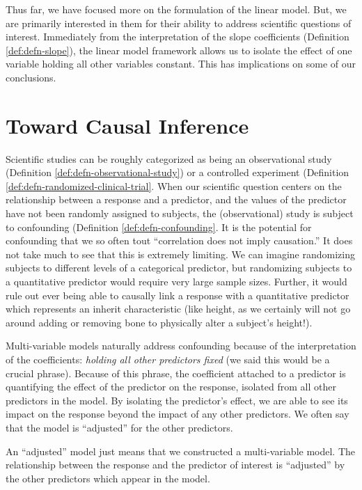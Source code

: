 \documentclass[
]{book}
\theoremstyle{plain}
\theoremstyle{mydefn}
\theoremstyle{myexmpl}
\theoremstyle{remark}
\begin{document}
Thus far, we have focused more on the formulation of the linear model. But, we are primarily interested in them for their ability to address scientific questions of interest. Immediately from the interpretation of the slope coefficients (Definition \ref{def:defn-slope}), the linear model framework allows us to isolate the effect of one variable holding all other variables constant. This has implications on some of our conclusions.

\hypertarget{toward-causal-inference}{%
\section{Toward Causal Inference}\label{toward-causal-inference}}

Scientific studies can be roughly categorized as being an observational study (Definition \ref{def:defn-observational-study}) or a controlled experiment (Definition \ref{def:defn-randomized-clinical-trial}. When our scientific question centers on the relationship between a response and a predictor, and the values of the predictor have not been randomly assigned to subjects, the (observational) study is subject to confounding (Definition \ref{def:defn-confounding}. It is the potential for confounding that we so often tout ``correlation does not imply causation.'' It does not take much to see that this is extremely limiting. We can imagine randomizing subjects to different levels of a categorical predictor, but randomizing subjects to a quantitative predictor would require very large sample sizes. Further, it would rule out ever being able to causally link a response with a quantitative predictor which represents an inherit characteristic (like height, as we certainly will not go around adding or removing bone to physically alter a subject's height!).

Multi-variable models naturally address confounding because of the interpretation of the coefficients: \emph{holding all other predictors fixed} (we said this would be a crucial phrase). Because of this phrase, the coefficient attached to a predictor is quantifying the effect of the predictor on the response, isolated from all other predictors in the model. By isolating the predictor's effect, we are able to see its impact on the response beyond the impact of any other predictors. We often say that the model is ``adjusted'' for the other predictors.

\begin{rmdtip}
An ``adjusted'' model just means that we constructed a multi-variable model. The relationship between the response and the predictor of interest is ``adjusted'' by the other predictors which appear in the model.
\end{rmdtip}
\end{document}
